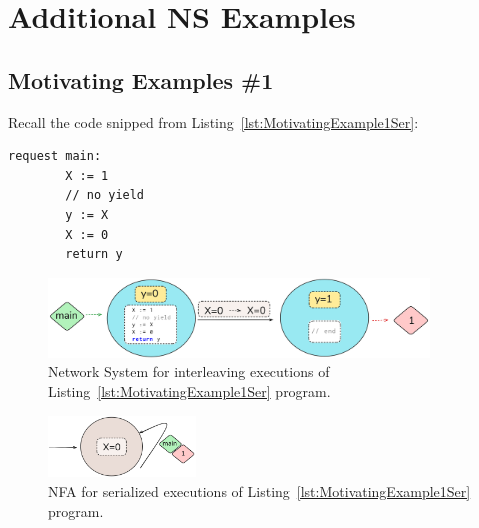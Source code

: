 \appendix

\section{Additional NS Examples}
\label{appendix:MoreNsExamples}



\subsection{Motivating Examples \#1}
\label{appendix:subsec::Ex1A:NS}


Recall the code snipped from Listing~\ref{lst:MotivatingExample1Ser}:


\begin{minipage}[t]{0.3\textwidth}
	\begin{lstlisting}[caption={Without yield or lock (serializable)}]
	request main: 
		X := 1 
		// no yield
		y := X 
		X := 0
		return y 
	\end{lstlisting}
\end{minipage}

\begin{figure}[htbp]
	\centering
	\includegraphics[width=0.9\textwidth]{plots/code_1_NS.png}
	\caption{Network System for interleaving executions of Listing~\ref{lst:MotivatingExample1Ser} program.}
	\label{fig:code1ExampleNS}
\end{figure}


\begin{figure}[htbp]
	\centering
	\includegraphics[width=0.35\textwidth]{plots/code_1_NFA.png}
	\caption{NFA for serialized executions of Listing~\ref{lst:MotivatingExample1Ser} program.}
	\label{fig:code1ExampleNFA}
\end{figure}



